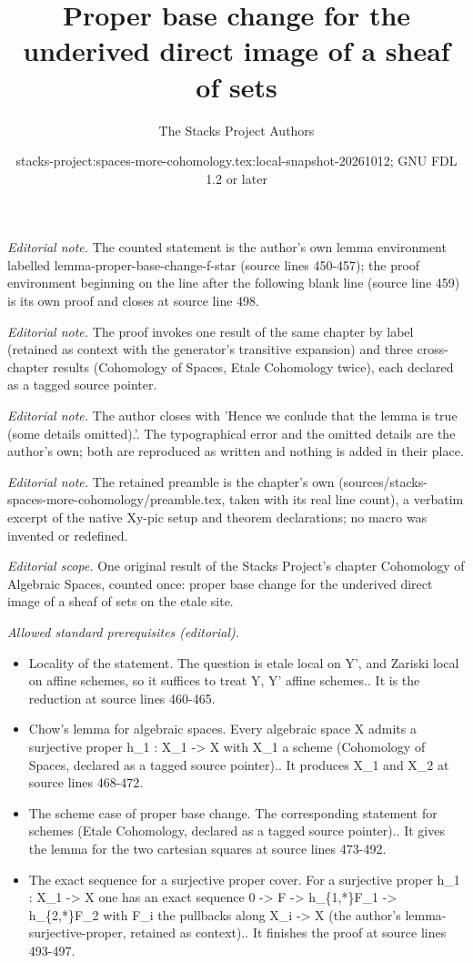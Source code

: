 \documentclass{stacks-project}
\title{Proper base change for the underived direct image of a sheaf of sets}
\author{The Stacks Project Authors}
\date{stacks-project:spaces-more-cohomology.tex:local-snapshot-20261012; GNU FDL 1.2 or later}
\theoremstyle{plain}
\theoremstyle{definition}
\theoremstyle{remark}
\numberwithin{equation}{subsection}
\begin{document}
\maketitle
\noindent\textit{Editorial note.} The counted statement is the author's own lemma environment labelled lemma-proper-base-change-f-star (source lines 450-457); the proof environment beginning on the line after the following blank line (source line 459) is its own proof and closes at source line 498.\par\medskip
\noindent\textit{Editorial note.} The proof invokes one result of the same chapter by label (retained as context with the generator's transitive expansion) and three cross-chapter results (Cohomology of Spaces, Etale Cohomology twice), each declared as a tagged source pointer.\par\medskip
\noindent\textit{Editorial note.} The author closes with 'Hence we conlude that the lemma is true (some details omitted).'. The typographical error and the omitted details are the author's own; both are reproduced as written and nothing is added in their place.\par\medskip
\noindent\textit{Editorial note.} The retained preamble is the chapter's own (sources/stacks-spaces-more-cohomology/preamble.tex, taken with its real line count), a verbatim excerpt of the native Xy-pic setup and theorem declarations; no macro was invented or redefined.\par\medskip
\noindent\textit{Editorial scope.} One original result of the Stacks Project's chapter Cohomology of Algebraic Spaces, counted once: proper base change for the underived direct image of a sheaf of sets on the etale site.\par\medskip
\noindent\textit{Allowed standard prerequisites (editorial).}\begin{itemize}
\item Locality of the statement. The question is etale local on Y', and Zariski local on affine schemes, so it suffices to treat Y, Y' affine schemes.. It is the reduction at source lines 460-465.
\item Chow's lemma for algebraic spaces. Every algebraic space X admits a surjective proper h\_1 : X\_1 -> X with X\_1 a scheme (Cohomology of Spaces, declared as a tagged source pointer).. It produces X\_1 and X\_2 at source lines 468-472.
\item The scheme case of proper base change. The corresponding statement for schemes (Etale Cohomology, declared as a tagged source pointer).. It gives the lemma for the two cartesian squares at source lines 473-492.
\item The exact sequence for a surjective proper cover. For a surjective proper h\_1 : X\_1 -> X one has an exact sequence 0 -> F -> h\_\{1,*\}F\_1 -> h\_\{2,*\}F\_2 with F\_i the pullbacks along X\_i -> X (the author's lemma-surjective-proper, retained as context).. It finishes the proof at source lines 493-497.
\end{itemize}\medskip
\end{document}
